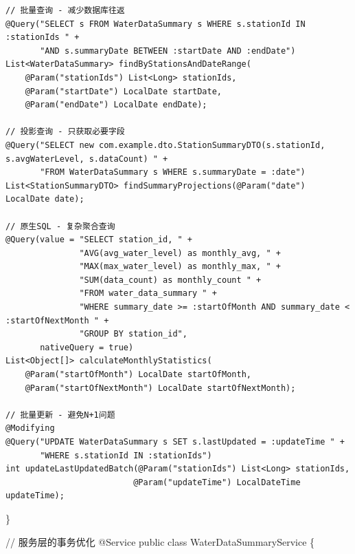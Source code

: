 \begin{verbatim}
// 批量查询 - 减少数据库往返
@Query("SELECT s FROM WaterDataSummary s WHERE s.stationId IN :stationIds " +
       "AND s.summaryDate BETWEEN :startDate AND :endDate")
List<WaterDataSummary> findByStationsAndDateRange(
    @Param("stationIds") List<Long> stationIds,
    @Param("startDate") LocalDate startDate,
    @Param("endDate") LocalDate endDate);

// 投影查询 - 只获取必要字段
@Query("SELECT new com.example.dto.StationSummaryDTO(s.stationId, s.avgWaterLevel, s.dataCount) " +
       "FROM WaterDataSummary s WHERE s.summaryDate = :date")
List<StationSummaryDTO> findSummaryProjections(@Param("date") LocalDate date);

// 原生SQL - 复杂聚合查询
@Query(value = "SELECT station_id, " +
               "AVG(avg_water_level) as monthly_avg, " +
               "MAX(max_water_level) as monthly_max, " +
               "SUM(data_count) as monthly_count " +
               "FROM water_data_summary " +
               "WHERE summary_date >= :startOfMonth AND summary_date < :startOfNextMonth " +
               "GROUP BY station_id",
       nativeQuery = true)
List<Object[]> calculateMonthlyStatistics(
    @Param("startOfMonth") LocalDate startOfMonth,
    @Param("startOfNextMonth") LocalDate startOfNextMonth);

// 批量更新 - 避免N+1问题
@Modifying
@Query("UPDATE WaterDataSummary s SET s.lastUpdated = :updateTime " +
       "WHERE s.stationId IN :stationIds")
int updateLastUpdatedBatch(@Param("stationIds") List<Long> stationIds,
                          @Param("updateTime") LocalDateTime updateTime);
\end{verbatim}

\}

// 服务层的事务优化 @Service public class WaterDataSummaryService \{

